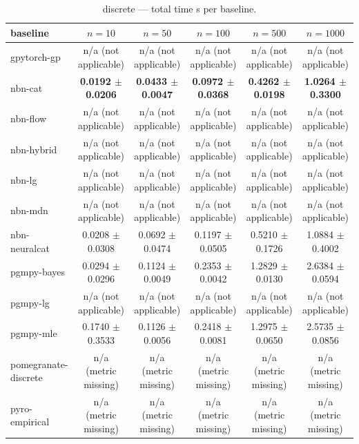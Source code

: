 \begin{table}[h]
\centering
\caption{discrete — total time s per baseline.}
\label{tab:discrete_total_time_s}
\begin{tabular}{lccccc}
\toprule
baseline & $n=10$ & $n=50$ & $n=100$ & $n=500$ & $n=1000$ \\
\midrule
gpytorch-gp & n/a (not applicable) & n/a (not applicable) & n/a (not applicable) & n/a (not applicable) & n/a (not applicable) \\
nbn-cat & \textbf{0.0192 $\pm$ 0.0206} & \textbf{0.0433 $\pm$ 0.0047} & \textbf{0.0972 $\pm$ 0.0368} & \textbf{0.4262 $\pm$ 0.0198} & \textbf{1.0264 $\pm$ 0.3300} \\
nbn-flow & n/a (not applicable) & n/a (not applicable) & n/a (not applicable) & n/a (not applicable) & n/a (not applicable) \\
nbn-hybrid & n/a (not applicable) & n/a (not applicable) & n/a (not applicable) & n/a (not applicable) & n/a (not applicable) \\
nbn-lg & n/a (not applicable) & n/a (not applicable) & n/a (not applicable) & n/a (not applicable) & n/a (not applicable) \\
nbn-mdn & n/a (not applicable) & n/a (not applicable) & n/a (not applicable) & n/a (not applicable) & n/a (not applicable) \\
nbn-neuralcat & 0.0208 $\pm$ 0.0308 & 0.0692 $\pm$ 0.0474 & 0.1197 $\pm$ 0.0505 & 0.5210 $\pm$ 0.1726 & 1.0884 $\pm$ 0.4002 \\
pgmpy-bayes & 0.0294 $\pm$ 0.0296 & 0.1124 $\pm$ 0.0049 & 0.2353 $\pm$ 0.0042 & 1.2829 $\pm$ 0.0130 & 2.6384 $\pm$ 0.0594 \\
pgmpy-lg & n/a (not applicable) & n/a (not applicable) & n/a (not applicable) & n/a (not applicable) & n/a (not applicable) \\
pgmpy-mle & 0.1740 $\pm$ 0.3533 & 0.1126 $\pm$ 0.0056 & 0.2418 $\pm$ 0.0081 & 1.2975 $\pm$ 0.0650 & 2.5735 $\pm$ 0.0856 \\
pomegranate-discrete & n/a (metric missing) & n/a (metric missing) & n/a (metric missing) & n/a (metric missing) & n/a (metric missing) \\
pyro-empirical & n/a (metric missing) & n/a (metric missing) & n/a (metric missing) & n/a (metric missing) & n/a (metric missing) \\
\bottomrule
\end{tabular}
\end{table}

